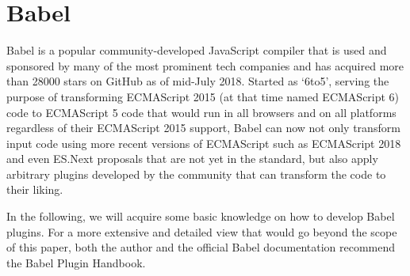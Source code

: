\section{Babel}
Babel is a popular community-developed JavaScript compiler
that is used and sponsored by many of the most prominent tech companies
and has acquired more than 28000 stars on GitHub as of mid-July 2018.
\autocite{BabelGithub}
Started as `6to5', serving the purpose of transforming
ECMAScript 2015 (at that time named ECMAScript 6) code to
ECMAScript 5 code that would run in all browsers and on all platforms
regardless of their ECMAScript 2015 support,
Babel can now not only transform input code using
more recent versions of ECMAScript such as ECMAScript 2018
and even ES.Next proposals that are not yet in the standard,
but also apply arbitrary plugins developed by the community
that can transform the code to their liking.
\autocite{BabelPluginPrevalGithub}
\autocite{PowerAssertGithub}

In the following, we will acquire some basic knowledge on how to develop Babel plugins.
For a more extensive and detailed view that would go beyond the scope of this paper,
both the author and the official Babel documentation recommend the Babel Plugin Handbook.
\autocite{BabelPluginHandbook}
